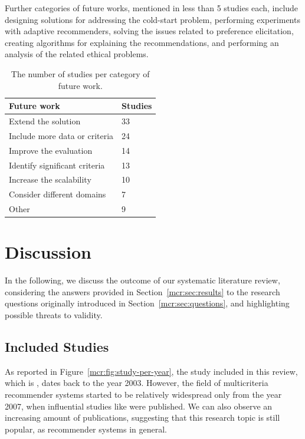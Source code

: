 Further categories of future works, mentioned in less than 5 studies each, include designing solutions for addressing the cold-start problem,  performing experiments with adaptive recommenders, solving the issues related to preference elicitation, creating algorithms for explaining the recommendations, and performing an analysis of the related ethical problems.

\begin{table}
\centering
\begin{tabular}{@{}ll@{}}
\toprule
Future work                   & Studies \\ \midrule
Extend the solution           & 33      \\
Include more data or criteria & 24      \\
Improve the evaluation        & 14      \\
Identify significant criteria & 13      \\
Increase the scalability      & 10      \\
Consider different domains    & 7       \\
Other                         & 9       \\ \bottomrule
\end{tabular}
\caption[Studies per category of future work]{The number of studies per category of future work.}
\label{mcr:tab:future}
\end{table}

\section{Discussion}
\label{mcr:sec:discussion}

In the following, we discuss the outcome of our systematic literature review, considering the answers provided in Section~\ref{mcr:sec:results} to the research questions originally introduced in Section~\ref{mcr:sec:questions}, and highlighting possible threats to validity.

\subsection{Included Studies}

As reported in Figure~\ref{mcr:fig:study-per-year}, the  study included in this review, which is , dates back to the year 2003. However, the field of multicriteria recommender systems started to be relatively widespread only from the year 2007, when influential studies like  were published. We can also observe an increasing amount of publications, suggesting that this research topic is still popular, as recommender systems in general. 

